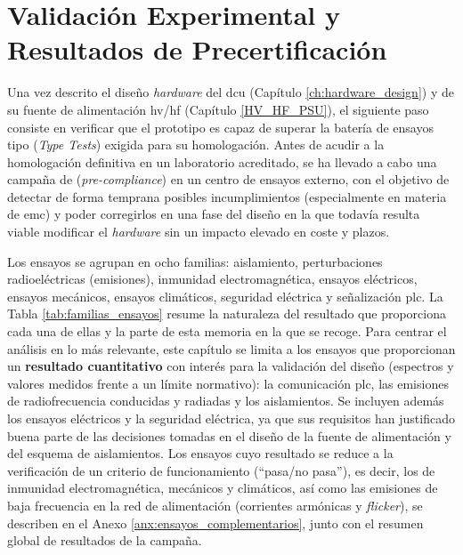 \chapter{Validación Experimental y Resultados de Precertificación}
\label{ch:precompliance_results}

Una vez descrito el diseño \textit{hardware} del \gls{dcu} (Capítulo \ref{ch:hardware_design}) y de su fuente de alimentación \gls{hv}/\gls{hf} (Capítulo \ref{HV_HF_PSU}), el siguiente paso consiste en verificar que el prototipo es capaz de superar la batería de ensayos tipo (\textit{Type Tests}) exigida para su homologación. Antes de acudir a la homologación definitiva en un laboratorio acreditado, se ha llevado a cabo una campaña de \textbf{} (\textit{pre-compliance}) en un centro de ensayos externo, con el objetivo de detectar de forma temprana posibles incumplimientos (especialmente en materia de \gls{emc}) y poder corregirlos en una fase del diseño en la que todavía resulta viable modificar el \textit{hardware} sin un impacto elevado en coste y plazos.

Los ensayos se agrupan en ocho familias: aislamiento, perturbaciones radioeléctricas (emisiones), inmunidad electromagnética, ensayos eléctricos, ensayos mecánicos, ensayos climáticos, seguridad eléctrica y señalización \gls{plc}. La Tabla \ref{tab:familias_ensayos} resume la naturaleza del resultado que proporciona cada una de ellas y la parte de esta memoria en la que se recoge. Para centrar el análisis en lo más relevante, este capítulo se limita a los ensayos que proporcionan un \textbf{resultado cuantitativo} con interés para la validación del diseño (espectros y valores medidos frente a un límite normativo): la comunicación \gls{plc}, las emisiones de radiofrecuencia conducidas y radiadas y los aislamientos. Se incluyen además los ensayos eléctricos y la seguridad eléctrica, ya que sus requisitos han justificado buena parte de las decisiones tomadas en el diseño de la fuente de alimentación y del esquema de aislamientos. Los ensayos cuyo resultado se reduce a la verificación de un criterio de funcionamiento (``pasa/no pasa''), es decir, los de inmunidad electromagnética, mecánicos y climáticos, así como las emisiones de baja frecuencia en la red de alimentación (corrientes armónicas y \textit{flicker}), se describen en el Anexo \ref{anx:ensayos_complementarios}, junto con el resumen global de resultados de la campaña.

